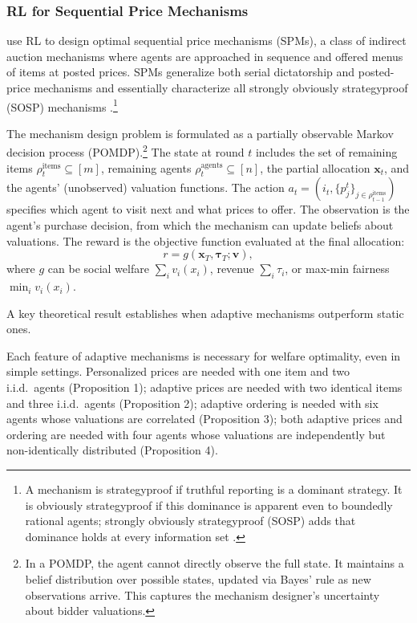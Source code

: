\subsubsection{RL for Sequential Price Mechanisms}

\citet{BreroEtAl2021} use RL to design optimal sequential price mechanisms (SPMs), a class of indirect auction mechanisms where agents are approached in sequence and offered menus of items at posted prices. SPMs generalize both serial dictatorship and posted-price mechanisms and essentially characterize all strongly obviously strategyproof (SOSP) mechanisms \citep{PyciaAndTroyan2019}.\footnote{A mechanism is strategyproof if truthful reporting is a dominant strategy. It is obviously strategyproof if this dominance is apparent even to boundedly rational agents; strongly obviously strategyproof (SOSP) adds that dominance holds at every information set \citep{PyciaAndTroyan2019}.}

The mechanism design problem is formulated as a partially observable Markov decision process (POMDP).\footnote{In a POMDP, the agent cannot directly observe the full state. It maintains a belief distribution over possible states, updated via Bayes' rule as new observations arrive. This captures the mechanism designer's uncertainty about bidder valuations.} The state at round $t$ includes the set of remaining items $\rho_t^{\text{items}} \subseteq [m]$, remaining agents $\rho_t^{\text{agents}} \subseteq [n]$, the partial allocation $\mathbf{x}_t$, and the agents' (unobserved) valuation functions. The action $a_t = (i_t, \{p_j^t\}_{j \in \rho_{t-1}^{\text{items}}})$ specifies which agent to visit next and what prices to offer. The observation is the agent's purchase decision, from which the mechanism can update beliefs about valuations. The reward is the objective function evaluated at the final allocation:
\begin{equation}
r = g(\mathbf{x}_T, \boldsymbol{\tau}_T; \mathbf{v}), \label{eq:brero_reward}
\end{equation}
where $g$ can be social welfare $\sum_{i} v_i(x_i)$, revenue $\sum_i \tau_i$, or max-min fairness $\min_i v_i(x_i)$.

A key theoretical result establishes when adaptive mechanisms outperform static ones.

\begin{theorem}
Each feature of adaptive mechanisms is necessary for welfare optimality, even in simple settings. Personalized prices are needed with one item and two i.i.d.\ agents (Proposition 1); adaptive prices are needed with two identical items and three i.i.d.\ agents (Proposition 2); adaptive ordering is needed with six agents whose valuations are correlated (Proposition 3); both adaptive prices and ordering are needed with four agents whose valuations are independently but non-identically distributed (Proposition 4).
\end{theorem}

